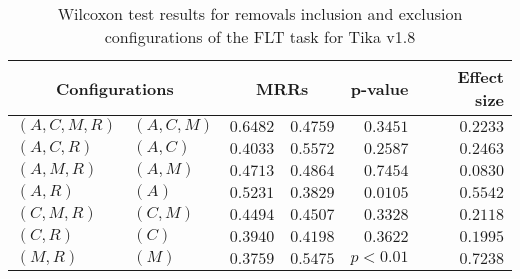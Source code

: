 
\begin{table}
\begin{spacing}{1.2}
\centering
\caption{Wilcoxon test results for removals inclusion and exclusion configurations of the FLT task for Tika v1.8}
\label{table:versus-wilcox-tika-flt-removals}
\begin{tabular}{ll|rr|rr}
\toprule
      \multicolumn{2}{c|}{Configurations} &          \multicolumn{2}{c|}{MRRs} &       p-value & Effect size \\
\midrule
 $(A,C,M,R)$ &  $(A,C,M)$ & $0.6482$ & $0.4759$ & $0.3451$ &    $0.2233$ \\
   $(A,C,R)$ &    $(A,C)$ & $0.4033$ & $0.5572$ & $0.2587$ &    $0.2463$ \\
   $(A,M,R)$ &    $(A,M)$ & $0.4713$ & $0.4864$ & $0.7454$ &    $0.0830$ \\
     $(A,R)$ &      $(A)$ & $0.5231$ & $0.3829$ & $0.0105$ &    $0.5542$ \\
   $(C,M,R)$ &    $(C,M)$ & $0.4494$ & $0.4507$ & $0.3328$ &    $0.2118$ \\
     $(C,R)$ &      $(C)$ & $0.3940$ & $0.4198$ & $0.3622$ &    $0.1995$ \\
     $(M,R)$ &      $(M)$ & $0.3759$ & $0.5475$ & $p<0.01$ &    $0.7238$ \\
\bottomrule
\end{tabular}

\end{spacing}
\end{table}

